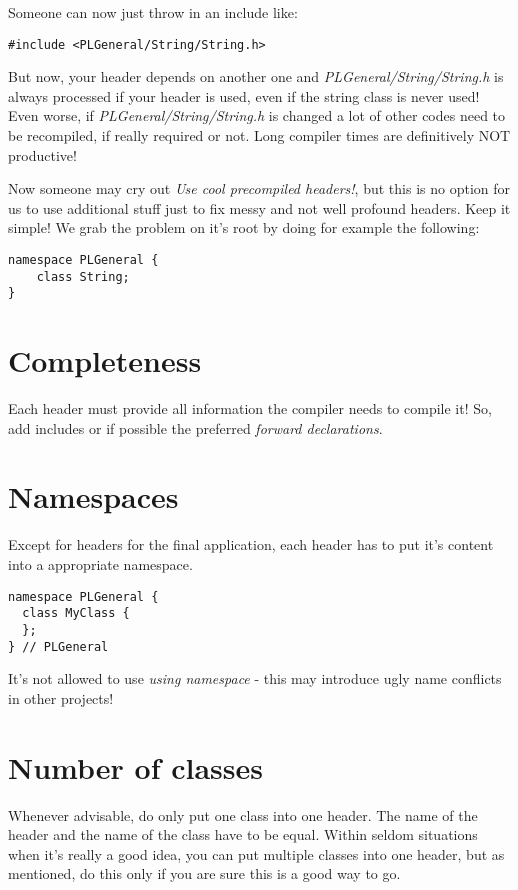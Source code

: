 Someone can now just throw in an include like:

\begin{lstlisting}[caption=Include]
#include <PLGeneral/String/String.h>
\end{lstlisting}

But now, your header depends on another one and \emph{PLGeneral/String/String.h} is always processed if your header is used, even if the string class is never used! Even worse, if \emph{PLGeneral/String/String.h} is changed a lot of other codes need to be recompiled, if really required or not. Long compiler times are definitively NOT productive!

Now someone may cry out \emph{Use cool precompiled headers!}, but this is no option for us to use additional stuff just to fix messy and not well profound headers. Keep it simple! We grab the problem on it's root by doing for example the following:

\begin{lstlisting}[caption=Forward declaration]
namespace PLGeneral {
    class String;
}
\end{lstlisting}




\section{Completeness}
Each header must provide all information the compiler needs to compile it! So, add includes or if possible the preferred \emph{forward declarations}.




\section{Namespaces}
Except for headers for the final application, each header has to put it's content into a appropriate namespace.

\begin{lstlisting}[caption=Namespace definition]
namespace PLGeneral {
  class MyClass {
  };
} // PLGeneral
\end{lstlisting}

It's not allowed to use \emph{using namespace} - this may introduce ugly name conflicts in other projects!




\section{Number of classes}
Whenever advisable, do only put one class into one header. The name of the header and the name of the class have to be equal. Within seldom situations when it's really a good idea, you can put multiple classes into one header, but as mentioned, do this only if you are sure this is a good way to go.




